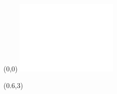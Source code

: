 





\begingroup\label{cover}
\thispagestyle{empty}

\hfill \vfill \tiny \ecodocnum
\begin{textblock}{5}(0,0)
    \centering
    \vspace{8mm}
	\includegraphics[width=5cm]{graphics/frontmatter/ip-paris-white.pdf}
	\vspace{300mm}
\end{textblock}


\begin{textblock}{1}(0.6,3)
	\Large{}
\end{textblock}

